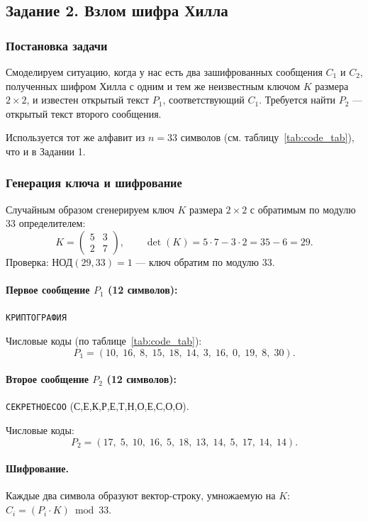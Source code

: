 \subsection{Задание 2. Взлом шифра Хилла}

\subsubsection{Постановка задачи}
Смоделируем ситуацию, когда у нас есть два зашифрованных сообщения $C_1$ и $C_2$, полученных шифром Хилла с одним и тем же неизвестным ключом $K$ размера $2\times 2$, и известен открытый текст $P_1$, соответствующий $C_1$. Требуется найти $P_2$ — открытый текст второго сообщения.

Используется тот же алфавит из $n = 33$ символов (см. таблицу~\ref{tab:code_tab}), что и в Задании 1.

\subsubsection{Генерация ключа и шифрование}

Случайным образом сгенерируем ключ $K$ размера $2\times 2$ с обратимым по модулю 33 определителем:
\[
K = \begin{pmatrix} 5 & 3 \\ 2 & 7 \end{pmatrix}, \qquad \det(K) = 5\cdot 7 - 3\cdot 2 = 35 - 6 = 29.
\]
Проверка: $\text{НОД}(29, 33) = 1$ — ключ обратим по модулю 33.

\paragraph{Первое сообщение $P_1$ (12 символов):}
\texttt{КРИПТОГРАФИЯ}

Числовые коды (по таблице~\ref{tab:code_tab}):
\[
P_1 = (10,\; 16,\; 8,\; 15,\; 18,\; 14,\; 3,\; 16,\; 0,\; 19,\; 8,\; 30).
\]

\paragraph{Второе сообщение $P_2$ (12 символов):}
\texttt{СЕКРЕТНОЕСОО} (С,Е,К,Р,Е,Т,Н,О,Е,С,О,О).

Числовые коды:
\[
P_2 = (17,\; 5,\; 10,\; 16,\; 5,\; 18,\; 13,\; 14,\; 5,\; 17,\; 14,\; 14).
\]

\paragraph{Шифрование.} Каждые два символа образуют вектор-строку, умножаемую на $K$:
$C_i = (P_i \cdot K) \bmod 33$.

